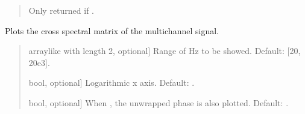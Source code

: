 \documentclass[letterpaper,10pt,english]{sphinxmanual}
\begin{document}
\begin{fulllineitems}
\begin{fulllineitems}
\begin{quote}
\begin{description}
\begin{description}
\end{description}

\begin{description}
\sphinxAtStartPar
Only returned if .

\end{description}

\end{description}\end{quote}

\end{fulllineitems}


\begin{fulllineitems}
\label{\detokenize{classes:dsptools.classes.signal_class.Signal.plot_csm}}
\pysigstartsignatures
{}
\pysigstopsignatures
\sphinxAtStartPar
Plots the cross spectral matrix of the multichannel signal.
\begin{quote}\begin{description}
\begin{description}
\sphinxlineitem{\sphinxstylestrong{range\_hz}}{[}array\sphinxhyphen{}like with length 2, optional{]}
\sphinxAtStartPar
Range of Hz to be showed. Default: {[}20, 20e3{]}.

\sphinxlineitem{\sphinxstylestrong{logx}}{[}bool, optional{]}
\sphinxAtStartPar
Logarithmic x axis. Default: .

\sphinxlineitem{\sphinxstylestrong{with\_phase}}{[}bool, optional{]}
\sphinxAtStartPar
When , the unwrapped phase is also plotted. Default: .


\end{description}
\end{description}
\end{quote}
\end{fulllineitems}
\end{fulllineitems}
\end{document}
